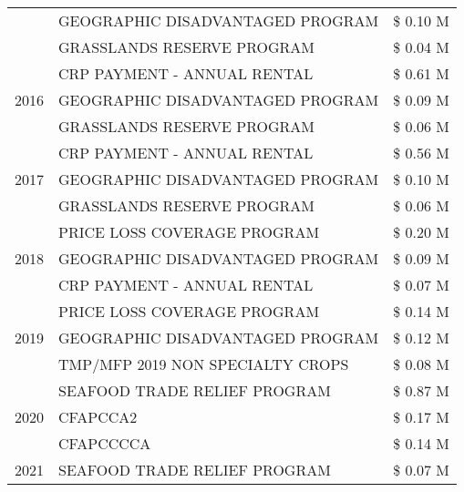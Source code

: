 \begin{tabular}{llr}
 & GEOGRAPHIC DISADVANTAGED PROGRAM & \$ 0.10 M \\
 & GRASSLANDS RESERVE PROGRAM & \$ 0.04 M \\
\cline{1-3}
\multirow[t]{3}{*}{2016} & CRP PAYMENT - ANNUAL RENTAL                   & \$ 0.61 M \\
 & GEOGRAPHIC DISADVANTAGED PROGRAM              & \$ 0.09 M \\
 & GRASSLANDS RESERVE PROGRAM                    & \$ 0.06 M \\
\cline{1-3}
\multirow[t]{3}{*}{2017} & CRP PAYMENT - ANNUAL RENTAL & \$ 0.56 M \\
 & GEOGRAPHIC DISADVANTAGED PROGRAM & \$ 0.10 M \\
 & GRASSLANDS RESERVE PROGRAM & \$ 0.06 M \\
\cline{1-3}
\multirow[t]{3}{*}{2018} & PRICE LOSS COVERAGE PROGRAM & \$ 0.20 M \\
 & GEOGRAPHIC DISADVANTAGED PROGRAM & \$ 0.09 M \\
 & CRP PAYMENT - ANNUAL RENTAL & \$ 0.07 M \\
\cline{1-3}
\multirow[t]{3}{*}{2019} & PRICE LOSS COVERAGE PROGRAM & \$ 0.14 M \\
 & GEOGRAPHIC DISADVANTAGED PROGRAM & \$ 0.12 M \\
 & TMP/MFP 2019 NON SPECIALTY CROPS & \$ 0.08 M \\
\cline{1-3}
\multirow[t]{3}{*}{2020} & SEAFOOD TRADE RELIEF PROGRAM & \$ 0.87 M \\
 & CFAPCCA2 & \$ 0.17 M \\
 & CFAPCCCCA & \$ 0.14 M \\
\cline{1-3}
2021 & SEAFOOD TRADE RELIEF PROGRAM & \$ 0.07 M \\
\cline{1-3}
\bottomrule
\end{tabular}

